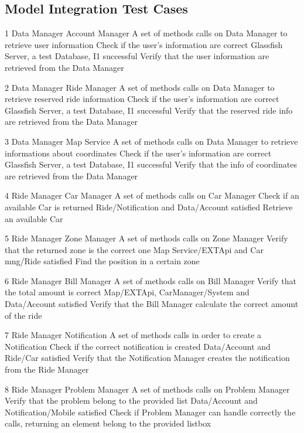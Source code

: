 \subsection{Model Integration Test Cases}
\testCase
	{1}
	{Data Manager}
	{Account Manager}
	{A set of methods calls on Data Manager to retrieve user information}
	{Check if the user's information are correct}
	{Glassfish Server, a test Database, I1 successful}
	{Verify that the user information are retrieved from the Data Manager}

\testCase
	{2}
	{Data Manager}
	{Ride Manager}
	{A set of methods calls on Data Manager to retrieve reserved ride information}
	{Check if the user's information are correct}
	{Glassfish Server, a test Database, I1 successful}
	{Verify that the reserved ride info are retrieved from the Data Manager}
	
\testCase
	{3}
	{Data Manager}
	{Map Service}
	{A set of methods calls on Data Manager to retrieve informations about coordinates}
	{Check if the user's information are correct}
	{Glassfish Server, a test Database, I1 successful}
	{Verify that the info of coordinates are retrieved from the Data Manager}

\testCase
	{4}
	{Ride Manager}
	{Car Manager}
	{A set of methods calls on Car Manager}
	{Check if an available Car is returned}
	{Ride/Notification and Data/Account satisfied}
	{Retrieve an available Car}

\testCase
	{5}
	{Ride Manager}
	{Zone Manager}
	{A set of methods calls on Zone Manager}
	{Verify that the returned zone is the correct one}
	{Map Service/EXTApi and Car mng/Ride satisfied}
	{Find the position in a certain zone}

\testCase
	{6}
	{Ride Manager}
	{Bill Manager}
	{A set of methods calls on Bill Manager}
	{Verify that the total amount is correct}
	{Map/EXTApi, CarManager/System and Data/Account satisfied}
	{Verify that the Bill Manager calculate the correct amount of the ride}

\testCase
	{7}
	{Ride Manager}
	{Notification}
	{A set of methods calls in order to create a Notification}
	{Check if the correct notification is created}
	{Data/Account and Ride/Car satisfied}
	{Verify that the Notification Manager creates the notification from the Ride Manager}
	
\testCase
	{8}
	{Ride Manager}
	{Problem Manager}
	{A set of methods calls on Problem Manager}
	{Verify that the problem belong to the provided list}
	{Data/Account and Notification/Mobile satisfied}
	{Check if Problem Manager can handle correctly the calls, returning an element belong to the provided listbox}
	
